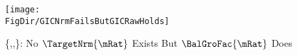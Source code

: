 \begin{figure}[tbp]
\centerline{\texttt{[image: \\FigDir/GICNrmFailsButGICRawHolds]}}
\caption{\{\FVAC,\GICRaw,\cncl{\GICNrm}\}: No $\TargetNrm{\mRat}$ Exists But $\BalGroFac{\mRat}$ Does}
\label{fig:GICNrmFailsButGICRawHolds}
\end{figure}
